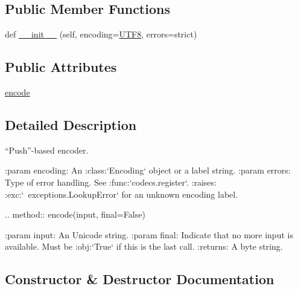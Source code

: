 \subsection*{Public Member Functions}
\begin{DoxyCompactItemize}
\item 
def \hyperlink{classpip_1_1__vendor_1_1webencodings_1_1IncrementalEncoder_aab6f5a6952b0900258a13ad8b7a9d494}{\+\_\+\+\_\+init\+\_\+\+\_\+} (self, encoding=\hyperlink{namespacepip_1_1__vendor_1_1webencodings_a2eb014d3f6305ba50ece3cad231b60bf}{U\+T\+F8}, errors=\textquotesingle{}strict\textquotesingle{})
\end{DoxyCompactItemize}
\subsection*{Public Attributes}
\begin{DoxyCompactItemize}
\item 
\hyperlink{classpip_1_1__vendor_1_1webencodings_1_1IncrementalEncoder_a65e186cdfa8a858b97fc12072baba99e}{encode}
\end{DoxyCompactItemize}


\subsection{Detailed Description}
\begin{DoxyVerb}“Push”-based encoder.

:param encoding: An :class:`Encoding` object or a label string.
:param errors: Type of error handling. See :func:`codecs.register`.
:raises: :exc:`~exceptions.LookupError` for an unknown encoding label.

.. method:: encode(input, final=False)

    :param input: An Unicode string.
    :param final:
        Indicate that no more input is available.
        Must be :obj:`True` if this is the last call.
    :returns: A byte string.\end{DoxyVerb}
 

\subsection{Constructor \& Destructor Documentation}
\mbox{\label{classpip_1_1__vendor_1_1webencodings_1_1IncrementalEncoder_aab6f5a6952b0900258a13ad8b7a9d494}} 

